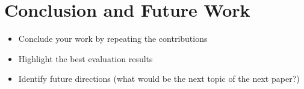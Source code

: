 \section{Conclusion and Future Work}
\label{sec:conclusion}
\begin{itemize}
	\item Conclude your work by repeating the contributions
	\item Highlight the best evaluation results
	\item Identify future directions (what would be the next topic of the next paper?)
\end{itemize}